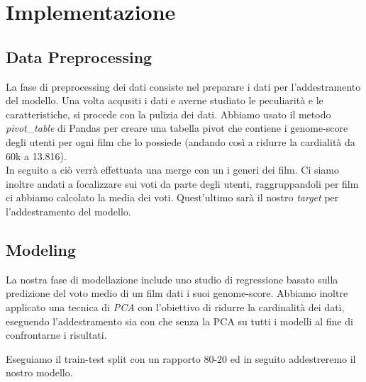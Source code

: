 \documentclass[../../Report.tex]{subfiles}
\begin{document}
\chapter{Implementazione}
\section{Data Preprocessing}
La fase di preprocessing dei dati consiste nel preparare i dati per l'addestramento del modello.
Una volta acqusiti i dati e averne studiato le peculiarità e le caratteristiche, si procede con la pulizia dei dati.
Abbiamo usato il metodo \textit{pivot\_table} di Pandas per creare una tabella pivot che contiene i genome-score degli utenti per ogni film che lo possiede (andando così a ridurre la cardialità da 60k a 13.816).\\
In seguito a ciò verrà effettuata una merge con un i generi dei film.
Ci siamo inoltre andati a focalizzare sui voti da parte degli utenti, raggruppandoli per film ci abbiamo calcolato la media dei voti.
Quest'ultimo sarà il nostro \textit{target} per l'addestramento del modello.\\

\section{Modeling}
La nostra fase di modellazione include uno studio di regressione basato sulla predizione del voto medio di un film dati i suoi genome-score.
Abbiamo inoltre applicato una tecnica di \textit{PCA} con l'obiettivo di ridurre la cardinalità dei dati, eseguendo l'addestramento sia con che senza la PCA su tutti i modelli al fine di confrontarne i risultati.

Eseguiamo il train-test split con un rapporto 80-20 ed in seguito addestreremo il nostro modello.
\end{document}

